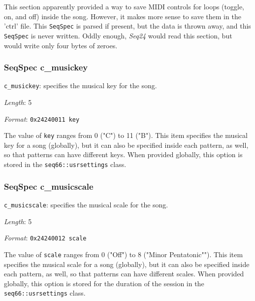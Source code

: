   This section apparently provided a way to save MIDI controls for loops
   (toggle, on, and off) inside the song.  However, it makes more sense to
   save them in the 'ctrl' file.  This
   \texttt{SeqSpec} is parsed if present, but
   the data is thrown away, and this
   \texttt{SeqSpec} is never written.
   Oddly enough, \textsl{Seq24} would read this section, but would write only
   four bytes of zeroes.

\subsubsection{SeqSpec c\_musickey}
\label{subsubsec:midi_format_track_seqspec_musickey}

   \begin{description}
      \item \texttt{c\_musickey}: specifies the musical key for the song.
      \item \textsl{Length}: 5
      \item \textsl{Format}: \texttt{0x24240011 key}
   \end{description}

   The value of \texttt{key} ranges from 0 ("C") to 11 ("B").
   This item specifies the musical key for a song (globally), but it
   can also be specified inside each pattern, as well, so that patterns
   can have different keys.
   When provided globally, this option is stored in the
   \texttt{seq66::usrsettings} class.

\subsubsection{SeqSpec c\_musicscale}
\label{subsubsec:midi_format_track_seqspec_musicscale}

   \begin{description}
      \item \texttt{c\_musicscale}: specifies the musical scale for the song.
      \item \textsl{Length}: 5
      \item \textsl{Format}: \texttt{0x24240012 scale}
   \end{description}

   The value of \texttt{scale} ranges from 0 ("Off") to 8 ("Minor Pentatonic"").
   This item specifies the musical scale for a song (globally), but it
   can also be specified inside each pattern, as well, so that patterns
   can have different scales.
   When provided globally, this option is stored for the duration
   of the session in the
   \texttt{seq66::usrsettings} class.


